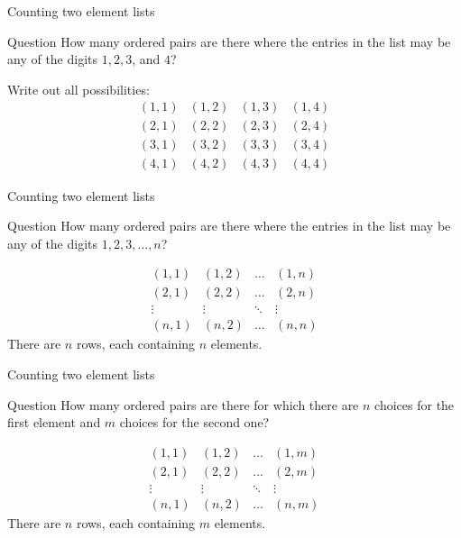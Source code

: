 \documentclass{beamer}
\begin{document}
\begin{frame}[t]{Counting two element lists}
\begin{block}{Question}
How many ordered pairs are there where the entries in the list may be any of the digits $1,2,3$, and $4$?
\end{block}\pause
Write out all possibilities:
\[
\begin{array}{cccc}
(1,1)&(1,2)&(1,3)&(1,4)\\
(2,1)&(2,2)&(2,3)&(2,4)\\
(3,1)&(3,2)&(3,3)&(3,4)\\
(4,1)&(4,2)&(4,3)&(4,4)
\end{array}
\]
\end{frame}

\begin{frame}{Counting two element lists}
\begin{block}{Question}
How many ordered pairs are there where the entries in the list may be any of the digits $1,2,3,\dots,n$?
\end{block}\pause

\[
\begin{array}{cccc}
(1,1)&(1,2)&\dots&(1,n)\\
(2,1)&(2,2)&\dots&(2,n)\\
\vdots&\vdots&\ddots&\vdots\\
(n,1)&(n,2)&\dots&(n,n)
\end{array}
\]\pause
There are $n$ rows, each containing $n$ elements.\pause
{}
\end{frame}

\begin{frame}{Counting two element lists}
\begin{block}{Question}
How many ordered pairs are there for which there are $n$ choices for the first element and $m$ choices for the second one?
\end{block}\pause

\[
\begin{array}{cccc}
(1,1)&(1,2)&\dots&(1,m)\\
(2,1)&(2,2)&\dots&(2,m)\\
\vdots&\vdots&\ddots&\vdots\\
(n,1)&(n,2)&\dots&(n,m)
\end{array}
\]\pause
There are $n$ rows, each containing $m$ elements.\pause
{}
\end{frame}
\end{document}
